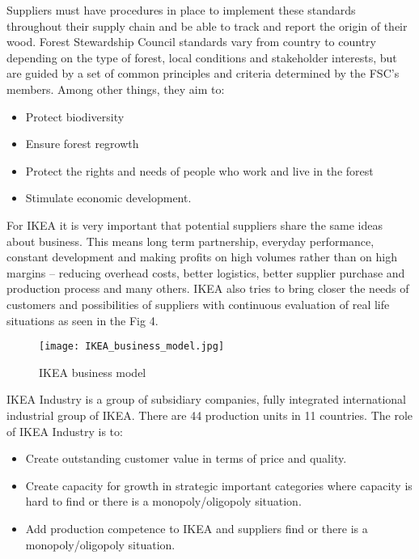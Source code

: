\documentclass[oneside,12pt]{article}%
\begin{document}
Suppliers must have procedures in place to implement these standards throughout their supply chain and be able to track and report the origin of their wood.
Forest Stewardship Council standards vary from country to country depending on the type of forest, local conditions and stakeholder interests, but are guided by a set of common principles and criteria determined by the FSC’s members. Among other things, they aim to:

\begin{itemize}
  \item Protect biodiversity
  \item Ensure forest regrowth
  \item Protect the rights and needs of people who work and live in the forest
  \item Stimulate economic development.
\end{itemize}


For IKEA it is very important that potential suppliers share the same ideas about business. This means long term partnership, everyday performance, constant development and making profits on high volumes rather than on high margins – reducing overhead costs, better logistics, better supplier purchase and production process and many others. IKEA also tries to bring closer the needs of customers and possibilities of suppliers with continuous evaluation of real life situations as seen in the Fig 4.


\begin{figure}[ht!]
  \texttt{[image: IKEA\_business\_model.jpg]}
  \caption{IKEA business model}
\end{figure}



IKEA Industry is a group of subsidiary companies, fully integrated international industrial group of IKEA. There are 44 production units in 11 countries.
The role of IKEA Industry is to:
\begin{itemize}
  \item Create outstanding customer value in terms of price and quality.
  \item Create capacity for growth in strategic important categories where capacity is hard to find or there is a monopoly/oligopoly situation.
  \item Add production competence to IKEA and suppliers find or there is a monopoly/oligopoly situation.

\end{itemize}
\end{document}
